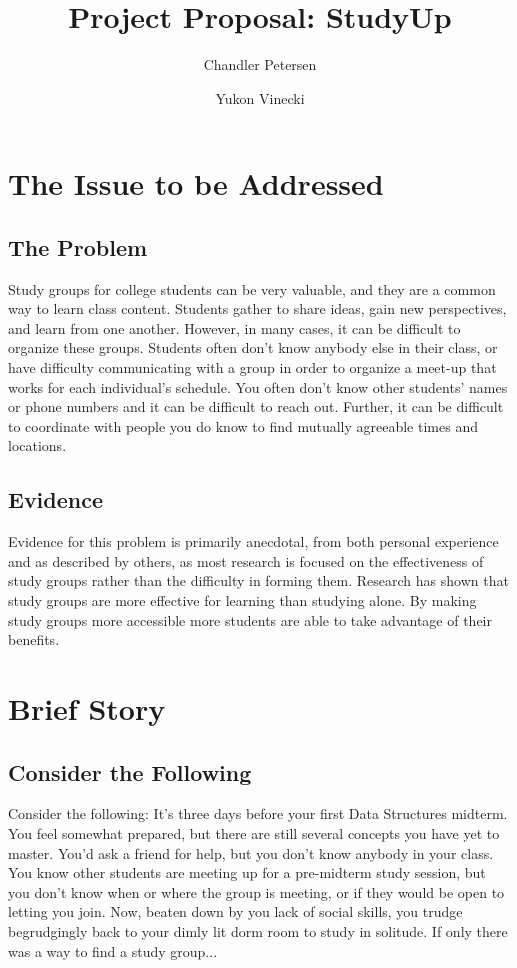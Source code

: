 \documentclass[12pt]{article}
\title{Project Proposal: StudyUp}
\author[1]{Chandler Petersen}
\author[2]{Yukon Vinecki}
\affil[1]{petercha, EECS - Oregon State University}
\affil[2]{vineckiy, EECS - Oregon State University}
\begin{document}
\maketitle
\tableofcontents


\section{The Issue to be Addressed}
\subsection{The Problem}
Study groups for college students can be very valuable, and they are a common way to learn class content. Students gather to share ideas, gain new perspectives, and learn from one another. However, in many cases, it can be difficult to organize these groups. Students often don't know anybody else in their class, or have difficulty communicating with a group in order to organize a meet-up that works for each individual's schedule. You often don't know other students' names or phone numbers and it can be difficult to reach out. Further, it can be difficult to coordinate with people you do know to find mutually agreeable times and locations.  

\subsection{Evidence}
Evidence for this problem is primarily anecdotal, from both personal experience and as described by others, as most research is focused on the effectiveness of study groups rather than the difficulty in forming them. Research has shown that study groups are more effective for learning than studying alone\cite{StudyGroupResearch}. By making study groups more accessible more students are able to take advantage of their benefits. 

\section{Brief Story}
\subsection{Consider the Following}
Consider the following: It's three days before your first Data Structures midterm. You feel somewhat prepared, but there are still several concepts you have yet to master. You'd ask a friend for help, but you don't know anybody in your class. You know other students are meeting up for a pre-midterm study session, but you don't know when or where the group is meeting, or if they would be open to letting you join. Now, beaten down by you lack of social skills, you trudge begrudgingly back to your dimly lit dorm room to study in solitude. If only there was a way to find a study group...
\end{document}
